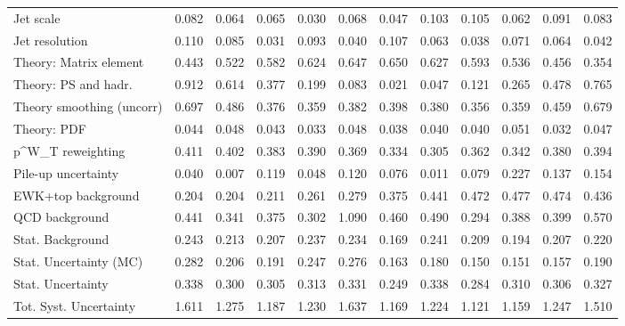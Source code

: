 \begin{tabular}{l|p{0.6cm}p{0.6cm}p{0.6cm}p{0.6cm}p{0.6cm}p{0.6cm}p{0.6cm}p{0.6cm}p{0.6cm}p{0.6cm}p{0.6cm}}
Jet scale                                & 0.082 & 0.064 & 0.065 & 0.030 & 0.068 & 0.047 & 0.103 & 0.105 & 0.062 & 0.091 & 0.083 \\
Jet resolution                           & 0.110 & 0.085 & 0.031 & 0.093 & 0.040 & 0.107 & 0.063 & 0.038 & 0.071 & 0.064 & 0.042 \\
Theory: Matrix element                   & 0.443 & 0.522 & 0.582 & 0.624 & 0.647 & 0.650 & 0.627 & 0.593 & 0.536 & 0.456 & 0.354 \\
Theory: PS and hadr.                     & 0.912 & 0.614 & 0.377 & 0.199 & 0.083 & 0.021 & 0.047 & 0.121 & 0.265 & 0.478 & 0.765 \\
Theory smoothing (uncorr)                & 0.697 & 0.486 & 0.376 & 0.359 & 0.382 & 0.398 & 0.380 & 0.356 & 0.359 & 0.459 & 0.679 \\
Theory: PDF                              & 0.044 & 0.048 & 0.043 & 0.033 & 0.048 & 0.038 & 0.040 & 0.040 & 0.051 & 0.032 & 0.047 \\
p^{W}_{T} reweighting                    & 0.411 & 0.402 & 0.383 & 0.390 & 0.369 & 0.334 & 0.305 & 0.362 & 0.342 & 0.380 & 0.394 \\
Pile-up uncertainty                      & 0.040 & 0.007 & 0.119 & 0.048 & 0.120 & 0.076 & 0.011 & 0.079 & 0.227 & 0.137 & 0.154 \\
EWK+top background                       & 0.204 & 0.204 & 0.211 & 0.261 & 0.279 & 0.375 & 0.441 & 0.472 & 0.477 & 0.474 & 0.436 \\
QCD background                           & 0.441 & 0.341 & 0.375 & 0.302 & 1.090 & 0.460 & 0.490 & 0.294 & 0.388 & 0.399 & 0.570 \\
Stat. Background                         & 0.243 & 0.213 & 0.207 & 0.237 & 0.234 & 0.169 & 0.241 & 0.209 & 0.194 & 0.207 & 0.220 \\
Stat. Uncertainty (MC)                   & 0.282 & 0.206 & 0.191 & 0.247 & 0.276 & 0.163 & 0.180 & 0.150 & 0.151 & 0.157 & 0.190 \\
\hline
Stat. Uncertainty                        & 0.338 & 0.300 & 0.305 & 0.313 & 0.331 & 0.249 & 0.338 & 0.284 & 0.310 & 0.306 & 0.327 \\
\hline
Tot. Syst. Uncertainty                   & 1.611 & 1.275 & 1.187 & 1.230 & 1.637 & 1.169 & 1.224 & 1.121 & 1.159 & 1.247 & 1.510 \\
\hline
\end{tabular}

